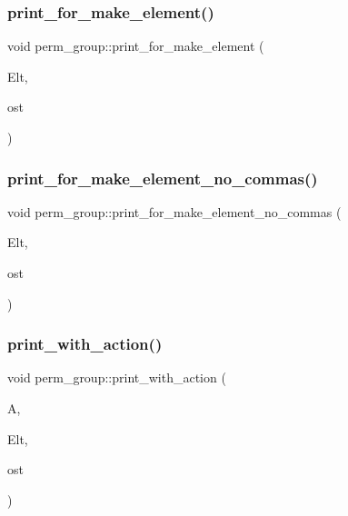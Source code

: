 \subsubsection{\texorpdfstring{print\+\_\+for\+\_\+make\+\_\+element()}{print\_for\_make\_element()}}
{\footnotesize\ttfamily void perm\+\_\+group\+::print\+\_\+for\+\_\+make\+\_\+element (\begin{DoxyParamCaption}\item[{\mbox{\hyperlink{galois_8h_a09fddde158a3a20bd2dcadb609de11dc}{I\+NT}} $\ast$}]{Elt,  }\item[{ostream \&}]{ost }\end{DoxyParamCaption})}

\mbox{\label{classperm__group_a2150133c6dec78dbfc16edafff6eae6c}} 
\subsubsection{\texorpdfstring{print\+\_\+for\+\_\+make\+\_\+element\+\_\+no\+\_\+commas()}{print\_for\_make\_element\_no\_commas()}}
{\footnotesize\ttfamily void perm\+\_\+group\+::print\+\_\+for\+\_\+make\+\_\+element\+\_\+no\+\_\+commas (\begin{DoxyParamCaption}\item[{\mbox{\hyperlink{galois_8h_a09fddde158a3a20bd2dcadb609de11dc}{I\+NT}} $\ast$}]{Elt,  }\item[{ostream \&}]{ost }\end{DoxyParamCaption})}

\mbox{\label{classperm__group_a71242a8999820fcb57e332699723ff0e}} 
\subsubsection{\texorpdfstring{print\+\_\+with\+\_\+action()}{print\_with\_action()}}
{\footnotesize\ttfamily void perm\+\_\+group\+::print\+\_\+with\+\_\+action (\begin{DoxyParamCaption}\item[{\mbox{\hyperlink{classaction}{action}} $\ast$}]{A,  }\item[{\mbox{\hyperlink{galois_8h_a09fddde158a3a20bd2dcadb609de11dc}{I\+NT}} $\ast$}]{Elt,  }\item[{ostream \&}]{ost }\end{DoxyParamCaption})}

